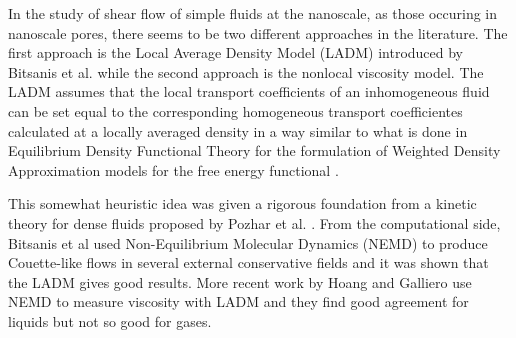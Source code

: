 \documentclass[a4paper,openright,12pt]{book}
\begin{document}
In the study of shear flow of simple fluids at the nanoscale, as those
occuring  in  nanoscale  pores,  there   seems  to  be  two  different
approaches in the literature.  The first approach is the Local Average
Density Model  (LADM) introduced by Bitsanis  et al.  \cite{Bitsanis1987}
while the second  approach is the nonlocal viscosity  model. 
The LADM assumes that the local transport coefficients of an inhomogeneous
fluid can be set equal to the corresponding homogeneous transport coefficientes calculated at a locally averaged density in a way similar to what  is done in Equilibrium Density  Functional Theory for the formulation of Weighted Density  Approximation models for the free energy functional \cite{Tarazona2008}.  %

This somewhat  heuristic idea
was given a rigorous foundation from a kinetic theory for dense fluids
proposed by Pozhar et al.  \cite{Pozhar1991a}.  From the computational
side,   Bitsanis  et   al  \cite{Bitsanis1987}   used  Non-Equilibrium
Molecular  Dynamics (NEMD)  to produce  Couette-like flows  in several
external conservative fields and it was shown that the LADM gives good
results.    More     recent    work    by    Hoang     and    Galliero
\cite{Hoang2012a,Hoang2012b} use  NEMD to  measure viscosity
with LADM and they find good agreement for liquids but not so good for
gases.
\end{document}
